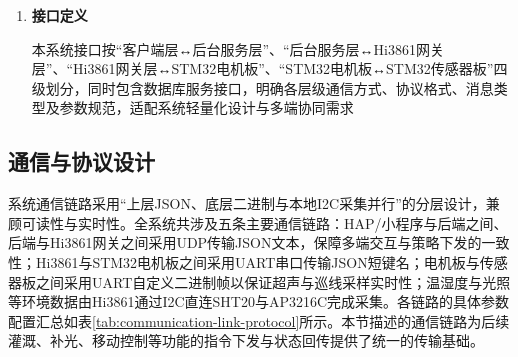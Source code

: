 \documentclass{article}
\begin{document}
\begin{enumerate}
\begin{itemize}[leftmargin=2em,itemsep=0.2em,topsep=0.2em]
        \item \textbf{虚实双模式管理模块：}内置模式切换开关，默认启动实物模式（与硬件执行层、边缘网关层联动），用户可通过用户终端层手动切换至演示模式；演示模式下，模拟传感器数据生成（按合理范围随机生成温湿度、光照、超声、巡线数据），模拟控制指令下发、执行反馈及数据流转全流程，无需关联硬件设备，即可完成系统全功能演示；两种模式切换时，自动保存当前系统状态（如当前环境数据、设备状态、控制参数），切换后无缝衔接，确保演示与实际运行场景的一致性；内置模式标识，同步至各模块与数据库，确保数据存储与展示的准确性。

        \item \textbf{数据存储与追溯模块：}对接数据库层，提供数据写入、查询、删除、更新等标准化接口；按时间戳对数据进行分区存储，将环境数据、控制记录、操作日志分类存储，提升查询效率；支持按时间范围、设备ID、数据类型（传感器数据、灌溉记录、补光记录）等条件查询历史数据，查询响应时间≤10秒；定期对数据进行备份，防止数据丢失，同时记录操作日志、控制日志，支撑系统运行可追溯，便于维护人员排查链路异常、设备故障；同步向客户端交互模块推送实时数据，支撑多端数据可视化展示。

    \end{itemize}

    \item \textbf{接口定义}
    
    本系统接口按“客户端层↔后台服务层”、“后台服务层↔Hi3861网关层”、“Hi3861网关层↔STM32电机板”、“STM32电机板↔STM32传感器板”四级划分，同时包含数据库服务接口，明确各层级通信方式、协议格式、消息类型及参数规范，适配系统轻量化设计与多端协同需求
    
\end{enumerate}

\subsection{通信与协议设计}

系统通信链路采用“上层JSON、底层二进制与本地I2C采集并行”的分层设计，兼顾可读性与实时性。全系统共涉及五条主要通信链路：HAP/小程序与后端之间、后端与Hi3861网关之间采用UDP传输JSON文本，保障多端交互与策略下发的一致性；Hi3861与STM32电机板之间采用UART串口传输JSON短键名；电机板与传感器板之间采用UART自定义二进制帧以保证超声与巡线采样实时性；温湿度与光照等环境数据由Hi3861通过I2C直连SHT20与AP3216C完成采集。各链路的具体参数配置汇总如表\ref{tab:communication-link-protocol}所示。本节描述的通信链路为后续灌溉、补光、移动控制等功能的指令下发与状态回传提供了统一的传输基础。
\end{document}
